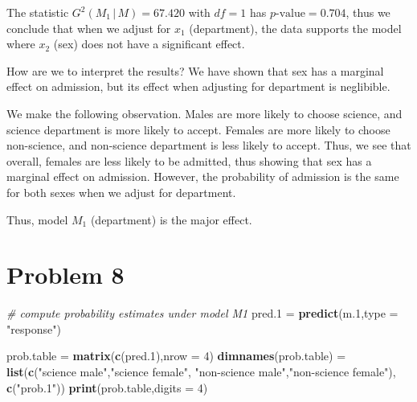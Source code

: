 \documentclass[
  11pt,
]{article}
\newenvironment{Shaded}{\begin{snugshade}}{\end{snugshade}}
\newcommand{\AttributeTok}[1]{\textcolor[rgb]{0.13,0.29,0.53}{#1}}
\newcommand{\CommentTok}[1]{\textcolor[rgb]{0.56,0.35,0.01}{\textit{#1}}}
\newcommand{\DecValTok}[1]{\textcolor[rgb]{0.00,0.00,0.81}{#1}}
\newcommand{\FloatTok}[1]{\textcolor[rgb]{0.00,0.00,0.81}{#1}}
\newcommand{\FunctionTok}[1]{\textcolor[rgb]{0.13,0.29,0.53}{\textbf{#1}}}
\newcommand{\NormalTok}[1]{#1}
\newcommand{\OtherTok}[1]{\textcolor[rgb]{0.56,0.35,0.01}{#1}}
\newcommand{\StringTok}[1]{\textcolor[rgb]{0.31,0.60,0.02}{#1}}
\begin{document}
The statistic \(G^2(M_1\,|\,M) = 67.420\) with \(df=1\) has
\(p\text{-value} = 0.704\), thus we conclude that when we adjust for
\(x_1\) (department), the data supports the model where \(x_2\) (sex)
does not have a significant effect.

How are we to interpret the results? We have shown that sex has a
marginal effect on admission, but its effect when adjusting for
department is neglibible.

We make the following observation. Males are more likely to choose
science, and science department is more likely to accept. Females are
more likely to choose non-science, and non-science department is less
likely to accept. Thus, we see that overall, females are less likely to
be admitted, thus showing that sex has a marginal effect on admission.
However, the probability of admission is the same for both sexes when we
adjust for department.

Thus, model \(M_1\) (department) is the major effect.

\hypertarget{problem-8}{%
\section{Problem 8}\label{problem-8}}


\begin{Shaded}
\begin{Highlighting}[]
\CommentTok{\# compute probability estimates under model M1}
\NormalTok{pred}\FloatTok{.1} \OtherTok{=} \FunctionTok{predict}\NormalTok{(m}\FloatTok{.1}\NormalTok{,}\AttributeTok{type =} \StringTok{"response"}\NormalTok{)}

\NormalTok{prob.table }\OtherTok{=} \FunctionTok{matrix}\NormalTok{(}\FunctionTok{c}\NormalTok{(pred}\FloatTok{.1}\NormalTok{),}\AttributeTok{nrow =} \DecValTok{4}\NormalTok{)}
\FunctionTok{dimnames}\NormalTok{(prob.table) }\OtherTok{=} \FunctionTok{list}\NormalTok{(}\FunctionTok{c}\NormalTok{(}\StringTok{"science male"}\NormalTok{,}\StringTok{"science female"}\NormalTok{,}
                              \StringTok{"non{-}science male"}\NormalTok{,}\StringTok{"non{-}science female"}\NormalTok{),}
                            \FunctionTok{c}\NormalTok{(}\StringTok{"prob.1"}\NormalTok{))}
\FunctionTok{print}\NormalTok{(prob.table,}\AttributeTok{digits =} \DecValTok{4}\NormalTok{)}
\end{Highlighting}
\end{Shaded}
\end{document}
